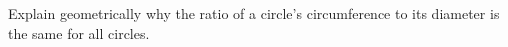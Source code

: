 Explain geometrically why the ratio of a circle's circumference to its diameter is the same for all circles.
